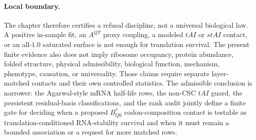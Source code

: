 \paragraph{Local boundary.}
The chapter therefore certifies a refusal discipline, not a universal biological law.  A positive in-sample fit, an $A^{QT}$ proxy coupling, a modeled $tAI$ or $stAI$ contact, or an all-$1.0$ saturated surface is not enough for translation survival.  The present finite evidence also does not imply ribosome occupancy, protein abundance, folded structure, physical admissibility, biological function, mechanism, phenotype, causation, or universality.  Those claims require separate layer-matched contacts and their own controlled statistics.  The admissible conclusion is narrower: the Agarwal-style mRNA half-life rows, the non-CSC $tAI$ guard, the persistent residual-basis classifications, and the rank audit jointly define a finite gate for deciding when a proposed $B^*_{Q6}$ codon-composition contact is testable as translation-conditioned RNA-stability survival and when it must remain a bounded association or a request for more matched rows.